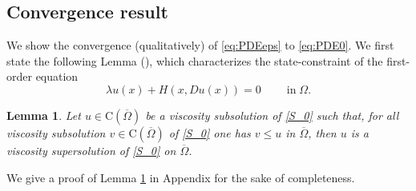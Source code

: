 \documentclass[11pt,reqno]{amsart}
\numberwithin{figure}{section}
\theoremstyle{plain}
\newtheorem{lem}[thm]{Lemma}
\theoremstyle{remark}
\numberwithin{equation}{section}
\newcommand{\rmC}{\mathrm{C}}
\begin{document}
\subsection{Convergence result} We show the convergence (qualitatively) of \eqref{eq:PDEeps} to \eqref{eq:PDE0}. We first state the following Lemma (\cite{Capuzzo-Dolcetta1990}), which characterizes the state-constraint of the first-order equation
\begin{equation}\label{S_0}
 \lambda u(x) + H(x,Du(x)) = 0\;\qquad\text{in}\;\Omega. \tag{$S_0$}
\end{equation}

\begin{lem}\label{lem:max} Let $u\in \rmC(\overline{\Omega})$ be a viscosity subsolution of \eqref{S_0} such that, for all viscosity subsolution $v\in \rmC(\overline{\Omega})$ of \eqref{S_0} one has $v\leq u$ in $\overline{\Omega}$, then $u$ is a viscosity supersolution of \eqref{S_0} on $\overline{\Omega}$.
\end{lem}
\noindent We give a proof of Lemma \ref{lem:max} in Appendix for the sake of completeness. 
\end{document}

